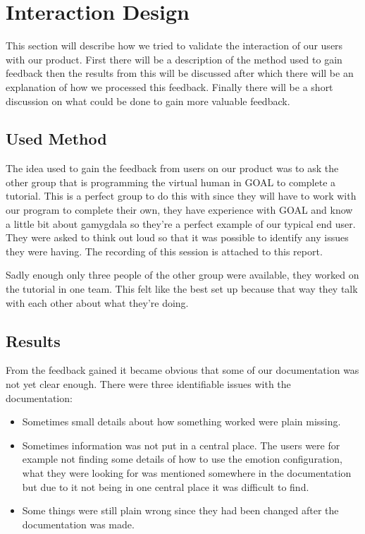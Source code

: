 \documentclass[]{article}
\begin{document}
\section{Interaction Design}
This section will describe how we tried to validate the interaction of our users with our product. First there will be a description of the method used to gain feedback then the results from this will be discussed after which there will be an explanation of how we processed this feedback. Finally there will be a short discussion on what could be done to gain more valuable feedback.

\subsection{Used Method}
The idea used to gain the feedback from users on our product was to ask  the other group that is programming the virtual human in GOAL to complete a tutorial. This is a perfect group to do this with since they will have to work with our program to complete their own, they have experience with GOAL and know a little bit about gamygdala so they're a perfect example of our typical end user. They were asked to think out loud so that it was possible to identify any issues they were having. The recording of this session is attached to this report.

Sadly enough only three people of the other group were available, they worked on the tutorial in one team. This felt like the best set up because that way they talk with each other about what they're doing.

\subsection{Results}
From the feedback gained it became obvious that some of our documentation was not yet clear enough. There were three identifiable issues with the documentation:

\begin{itemize}
	\item  Sometimes small details about how something worked were plain missing.
	\item Sometimes information was not put in a central place. The users were for example not finding some details of how to use the emotion configuration, what they were looking for was mentioned somewhere in the documentation but due to it not being in one central place it was difficult to find.
	
	\item Some things were still plain wrong since they had been changed after the documentation was made.
\end{itemize}
\end{document}
